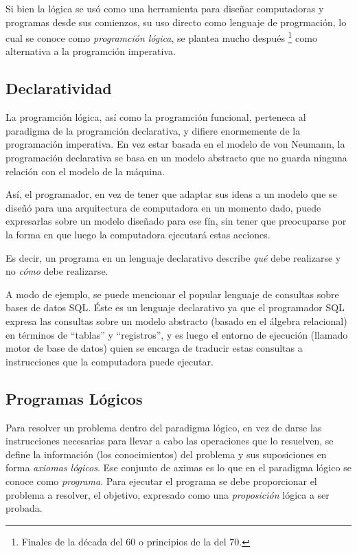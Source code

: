 \documentclass[12pt,titlepage]{article}
\begin{document}
Si bien la lógica se usó como una herramienta para diseñar computadoras y programas desde sus comienzos, su uso directo como lenguaje de progrmación, lo cual se conoce como \emph{programción lógica}, se plantea mucho después \footnote{Finales de la década del 60 o principios de la del 70.} como alternativa a la programción imperativa.

\subsection{Declaratividad}

La programción lógica, así como la programción funcional, perteneca al paradigma de la programción declarativa, y difiere enormemente de la programación imperativa. En vez estar basada en el modelo de von Neumann, la programación declarativa se basa en un modelo abstracto que no guarda ninguna relación con el modelo de la máquina. 

Así, el programador, en vez de tener que adaptar sus ideas a un modelo que se diseñó para una arquitectura de computadora en un momento dado, puede expresarlas sobre un modelo diseñado para ese fín, sin tener que preocuparse por la forma en que luego la computadora ejecutará estas acciones. 

Es decir, un programa en un lenguaje declarativo describe \emph{qué} debe realizarse y no \emph{cómo} debe realizarse.

A modo de ejemplo, se puede mencionar el popular lenguaje de consultas sobre bases de datos SQL. Éste es un lenguaje declarativo ya que el programador SQL expresa las consultas sobre un modelo abstracto (basado en el álgebra relacional) en términos de ``tablas'' y ``registros'', y es luego el entorno de ejecución (llamado motor de base de datos) quien se encarga de traducir estas consultas a instrucciones que la computadora puede ejecutar.

\subsection{Programas Lógicos}

Para resolver un problema dentro del paradigma lógico, en vez de darse las instrucciones necesarias para llevar a cabo las operaciones que lo resuelven, se define la información (los conocimientos) del problema y sus suposiciones en forma \emph{axiomas lógicos}. Ese conjunto de aximas es lo que en el paradigma lógico se conoce como \emph{programa}. Para ejecutar el programa se debe proporcionar el problema a resolver, el objetivo, expresado como una \emph{proposición} lógica a ser probada. 
\end{document}
